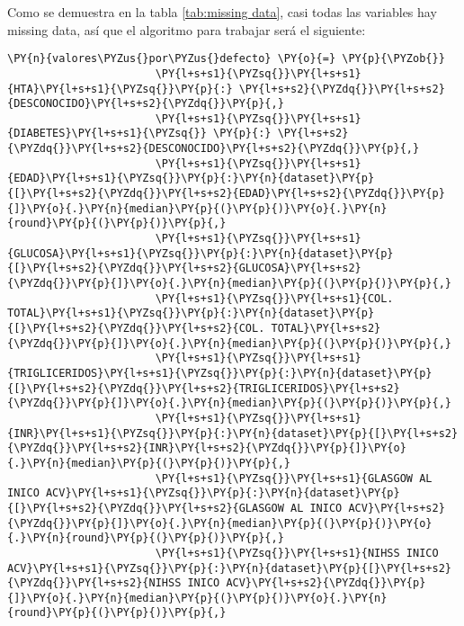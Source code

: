     Como se demuestra en la tabla \ref{tab:missing data}, casi todas las variables hay missing data, así que el algoritmo para
trabajar será el siguiente:

    \begin{tcolorbox}[breakable, size=fbox, boxrule=1pt, pad at break*=1mm,colback=cellbackground, colframe=cellborder]
\begin{Verbatim}[commandchars=\\\{\}]
\PY{n}{valores\PYZus{}por\PYZus{}defecto} \PY{o}{=} \PY{p}{\PYZob{}}
                       \PY{l+s+s1}{\PYZsq{}}\PY{l+s+s1}{HTA}\PY{l+s+s1}{\PYZsq{}}\PY{p}{:} \PY{l+s+s2}{\PYZdq{}}\PY{l+s+s2}{DESCONOCIDO}\PY{l+s+s2}{\PYZdq{}}\PY{p}{,}
                       \PY{l+s+s1}{\PYZsq{}}\PY{l+s+s1}{DIABETES}\PY{l+s+s1}{\PYZsq{}} \PY{p}{:} \PY{l+s+s2}{\PYZdq{}}\PY{l+s+s2}{DESCONOCIDO}\PY{l+s+s2}{\PYZdq{}}\PY{p}{,}
                       \PY{l+s+s1}{\PYZsq{}}\PY{l+s+s1}{EDAD}\PY{l+s+s1}{\PYZsq{}}\PY{p}{:}\PY{n}{dataset}\PY{p}{[}\PY{l+s+s2}{\PYZdq{}}\PY{l+s+s2}{EDAD}\PY{l+s+s2}{\PYZdq{}}\PY{p}{]}\PY{o}{.}\PY{n}{median}\PY{p}{(}\PY{p}{)}\PY{o}{.}\PY{n}{round}\PY{p}{(}\PY{p}{)}\PY{p}{,}
                       \PY{l+s+s1}{\PYZsq{}}\PY{l+s+s1}{GLUCOSA}\PY{l+s+s1}{\PYZsq{}}\PY{p}{:}\PY{n}{dataset}\PY{p}{[}\PY{l+s+s2}{\PYZdq{}}\PY{l+s+s2}{GLUCOSA}\PY{l+s+s2}{\PYZdq{}}\PY{p}{]}\PY{o}{.}\PY{n}{median}\PY{p}{(}\PY{p}{)}\PY{p}{,}
                       \PY{l+s+s1}{\PYZsq{}}\PY{l+s+s1}{COL. TOTAL}\PY{l+s+s1}{\PYZsq{}}\PY{p}{:}\PY{n}{dataset}\PY{p}{[}\PY{l+s+s2}{\PYZdq{}}\PY{l+s+s2}{COL. TOTAL}\PY{l+s+s2}{\PYZdq{}}\PY{p}{]}\PY{o}{.}\PY{n}{median}\PY{p}{(}\PY{p}{)}\PY{p}{,} 
                       \PY{l+s+s1}{\PYZsq{}}\PY{l+s+s1}{TRIGLICERIDOS}\PY{l+s+s1}{\PYZsq{}}\PY{p}{:}\PY{n}{dataset}\PY{p}{[}\PY{l+s+s2}{\PYZdq{}}\PY{l+s+s2}{TRIGLICERIDOS}\PY{l+s+s2}{\PYZdq{}}\PY{p}{]}\PY{o}{.}\PY{n}{median}\PY{p}{(}\PY{p}{)}\PY{p}{,}
                       \PY{l+s+s1}{\PYZsq{}}\PY{l+s+s1}{INR}\PY{l+s+s1}{\PYZsq{}}\PY{p}{:}\PY{n}{dataset}\PY{p}{[}\PY{l+s+s2}{\PYZdq{}}\PY{l+s+s2}{INR}\PY{l+s+s2}{\PYZdq{}}\PY{p}{]}\PY{o}{.}\PY{n}{median}\PY{p}{(}\PY{p}{)}\PY{p}{,}
                       \PY{l+s+s1}{\PYZsq{}}\PY{l+s+s1}{GLASGOW AL INICO ACV}\PY{l+s+s1}{\PYZsq{}}\PY{p}{:}\PY{n}{dataset}\PY{p}{[}\PY{l+s+s2}{\PYZdq{}}\PY{l+s+s2}{GLASGOW AL INICO ACV}\PY{l+s+s2}{\PYZdq{}}\PY{p}{]}\PY{o}{.}\PY{n}{median}\PY{p}{(}\PY{p}{)}\PY{o}{.}\PY{n}{round}\PY{p}{(}\PY{p}{)}\PY{p}{,}
                       \PY{l+s+s1}{\PYZsq{}}\PY{l+s+s1}{NIHSS INICO ACV}\PY{l+s+s1}{\PYZsq{}}\PY{p}{:}\PY{n}{dataset}\PY{p}{[}\PY{l+s+s2}{\PYZdq{}}\PY{l+s+s2}{NIHSS INICO ACV}\PY{l+s+s2}{\PYZdq{}}\PY{p}{]}\PY{o}{.}\PY{n}{median}\PY{p}{(}\PY{p}{)}\PY{o}{.}\PY{n}{round}\PY{p}{(}\PY{p}{)}\PY{p}{,} 

\end{Verbatim}
\end{tcolorbox}
